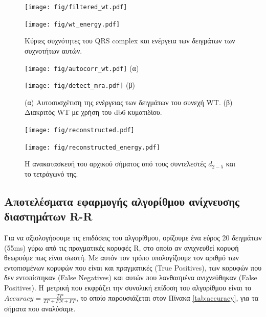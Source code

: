 \documentclass[11pt,a4paper]{article}
\begin{document}
\begin{figure}[H]
\centering
\begin{minipage}{0.48\textwidth}
	\centering
	\texttt{[image: fig/filtered\_wt.pdf]}
\end{minipage}
\begin{minipage}{0.48\textwidth}
	\centering
	\texttt{[image: fig/wt\_energy.pdf]}
\end{minipage}
\vfill
\caption{Κύριες συχνότητες του QRS complex και ενέργεια των δειγμάτων των συχνοτήτων αυτών.}
\label{fig:algorithm1}
\end{figure}
\begin{figure}[H]
\centering
\begin{minipage}{0.48\textwidth}
	\centering
	\texttt{[image: fig/autocorr\_wt.pdf]}	
	(α)
\end{minipage}
\begin{minipage}{0.48\textwidth}
	\centering
	\texttt{[image: fig/detect\_mra.pdf]}
	(β)
\end{minipage}
\vfill
\caption{(α) Αυτοσυσχέτιση της ενέργειας των δειγμάτων του συνεχή WT. (β) Διακριτός WT με χρήση του db6 κυματιδίου.}
\label{fig:algorithm2}
\end{figure}
\begin{figure}[H]
\centering
\begin{minipage}{0.48\textwidth}
	\centering
	\texttt{[image: fig/reconstructed.pdf]}
\end{minipage}
\begin{minipage}{0.48\textwidth}
	\centering
	\texttt{[image: fig/reconstructed\_energy.pdf]}
\end{minipage}
\vfill
\caption{Η ανακατασκευή του αρχικού σήματος από τους συντελεστές $d_{2-5}$ και το τετράγωνό της.}
\label{fig:algorithm3}
\end{figure}

\subsection*{Αποτελέσματα εφαρμογής αλγορίθμου ανίχνευσης διαστημάτων R-R}

Για να αξιολογήσουμε τις επιδόσεις του αλγορίθμου, ορίζουμε ένα εύρος 20 δειγμάτων (55ms) γύρω από τις πραγματικές κορυφές R, στο οποίο αν ανιχνευθεί κορυφή θεωρούμε πως είναι σωστή. Με αυτόν τον τρόπο υπολογίζουμε τον αριθμό των εντοπισμένων κορυφών που είναι και πραγματικές (True Positives), των κορυφών που δεν εντοπίστηκαν (False Negatives) και αυτών που λανθασμένα ανιχνεύθηκαν (False Positives). Η μετρική που εκφράζει την συνολική επίδοση του αλγορίθμου είναι το $Accuracy = \frac{TP}{TP+FN+FP}$, το οποίο παρουσιάζεται στον Πίνακα \ref{tab:accuracy}, για τα σήματα που αναλύσαμε.
\end{document}
